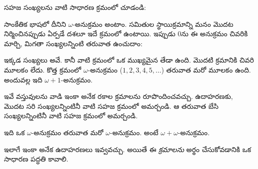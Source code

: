 \documentclass[../../../include/open-logic-section]{subfiles}
\begin{document}

సహజ సంఖ్యలను వాటి సాధారణ క్రమంలో చూడండి:
\begin{center}
\end{center}
సాంకేతిక భాషలో దీనిని
$\omega$-అనుక్రమం అంటాం.
సమితుల స్థాయిక్రమాన్ని మనం మొదట నిర్మించినప్పుడు
ఏర్పడే దశలూ ఇదే క్రమంలో ఉంటాయి. ఇప్పుడు
$0$ను ఈ
అనుక్రమం చివరికి
మార్చి, మిగతా సంఖ్యలన్నింటి
తరువాత ఉంచుదాం:
\begin{center}
\end{center}
ఇక్కడ సంఖ్యలు అవే. కానీ వాటి క్రమంలో ఒక
ముఖ్యమైన తేడా ఉంది. మొదటి క్రమానికి చివరి మూలకం లేదు.
కొత్త క్రమంలో $\omega$-అనుక్రమం ($1, 2, 3, 4, 5, \ldots$)
తరువాత మరో మూలకం ఉంది. అందువల్ల ఇది $\omega+1$-అనుక్రమం.

ఇవే వస్తువులను వాడి
ఇంకా అనేక రకాల
క్రమాలను రూపొందించవచ్చు.
ఉదాహరణకు, మొదట సరి సంఖ్యలన్నింటినీ వాటి సహజ క్రమంలో
అమర్చండి. ఆ తరువాత బేసి సంఖ్యలన్నింటినీ వాటి సహజ క్రమంలో అమర్చండి.
\begin{center}
\end{center}
ఇది ఒక $\omega$-అనుక్రమం
తరువాత మరో $\omega$-అనుక్రమం.
అంటే $\omega+\omega$-అనుక్రమం.

ఇలాగే ఇంకా అనేక ఉదాహరణలు ఇవ్వవచ్చు. అయితే ఈ \emph{క్రమాలను}
అర్థం చేసుకోవడానికి ఒక సాధారణ పద్ధతి కావాలి.
\end{document}
